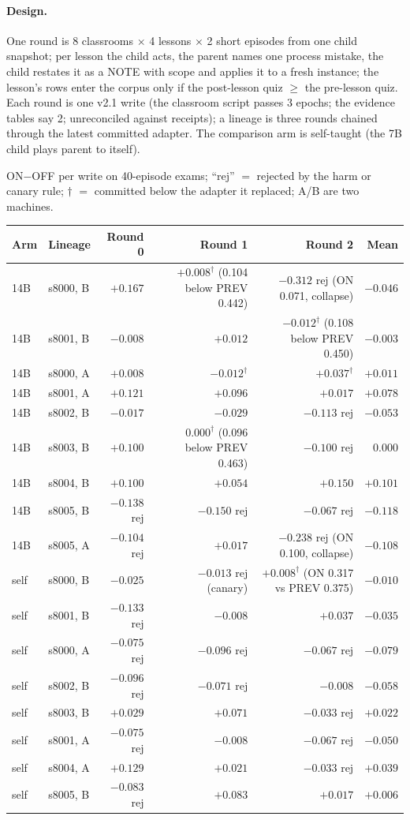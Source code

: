 \documentclass{article}
\newcommand{\onoff}{ON$-$OFF}
\begin{document}
\paragraph{Design.} One round is 8 classrooms $\times$ 4 lessons $\times$ 2 short episodes from one child snapshot; per lesson the child acts, the parent names one process mistake, the child restates it as a NOTE with scope and applies it to a fresh instance; the lesson's rows enter the corpus only if the post-lesson quiz $\ge$ the pre-lesson quiz. Each round is one v2.1 write (the classroom script passes 3 epochs; the evidence tables say 2; unreconciled against receipts); a lineage is three rounds chained through the latest committed adapter. The comparison arm is self-taught (the 7B child plays parent to itself).

\onoff{} per write on 40-episode exams; ``rej'' $=$ rejected by the harm or canary rule; $\dagger$ $=$ committed below the adapter it replaced; A/B are two machines.
\begin{center}\small
\begin{tabular}{llrrrr}
\toprule
Arm & Lineage & Round 0 & Round 1 & Round 2 & Mean \\
\midrule
14B & s8000, B & $+0.167$ & $+0.008^{\dagger}$ (0.104 below PREV 0.442) & $-0.312$ rej (ON 0.071, collapse) & $-0.046$ \\
14B & s8001, B & $-0.008$ & $+0.012$ & $-0.012^{\dagger}$ (0.108 below PREV 0.450) & $-0.003$ \\
14B & s8000, A & $+0.008$ & $-0.012^{\dagger}$ & $+0.037^{\dagger}$ & $+0.011$ \\
14B & s8001, A & $+0.121$ & $+0.096$ & $+0.017$ & $+0.078$ \\
14B & s8002, B & $-0.017$ & $-0.029$ & $-0.113$ rej & $-0.053$ \\
14B & s8003, B & $+0.100$ & $0.000^{\dagger}$ (0.096 below PREV 0.463) & $-0.100$ rej & $0.000$ \\
14B & s8004, B & $+0.100$ & $+0.054$ & $+0.150$ & $+0.101$ \\
14B & s8005, B & $-0.138$ rej & $-0.150$ rej & $-0.067$ rej & $-0.118$ \\
14B & s8005, A & $-0.104$ rej & $+0.017$ & $-0.238$ rej (ON 0.100, collapse) & $-0.108$ \\
\midrule
self & s8000, B & $-0.025$ & $-0.013$ rej (canary) & $+0.008^{\dagger}$ (ON 0.317 vs PREV 0.375) & $-0.010$ \\
self & s8001, B & $-0.133$ rej & $-0.008$ & $+0.037$ & $-0.035$ \\
self & s8000, A & $-0.075$ rej & $-0.096$ rej & $-0.067$ rej & $-0.079$ \\
self & s8002, B & $-0.096$ rej & $-0.071$ rej & $-0.008$ & $-0.058$ \\
self & s8003, B & $+0.029$ & $+0.071$ & $-0.033$ rej & $+0.022$ \\
self & s8001, A & $-0.075$ rej & $-0.008$ & $-0.067$ rej & $-0.050$ \\
self & s8004, A & $+0.129$ & $+0.021$ & $-0.033$ rej & $+0.039$ \\
self & s8005, B & $-0.083$ rej & $+0.083$ & $+0.017$ & $+0.006$ \\
\bottomrule
\end{tabular}
\end{center}
\end{document}
